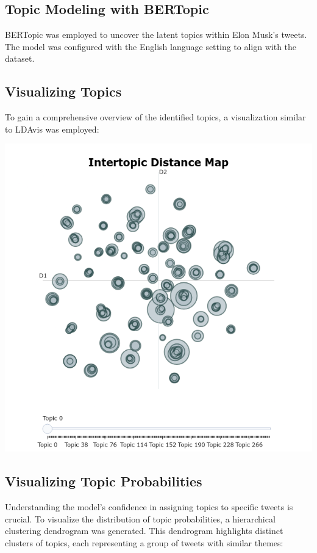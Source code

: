 \documentclass[12pt]{article}
\begin{document}
\subsection{Topic Modeling with BERTopic}
BERTopic was employed to uncover the latent topics within Elon Musk's tweets. The model was configured with the English language setting to align with the dataset.

\subsection{Visualizing Topics}
To gain a comprehensive overview of the identified topics, a visualization similar to LDAvis was employed: \\

\begin{minipage}{0.48\textwidth}
    \centering
    \includegraphics[width=\linewidth]{lda.png}
        \label{fig:lda}
    \end{minipage}\hfill
    \newpage
\subsection{Visualizing Topic Probabilities}
Understanding the model's confidence in assigning topics to specific tweets is crucial. To visualize the distribution of topic probabilities, a hierarchical clustering dendrogram was generated. This dendrogram highlights distinct clusters of topics, each representing a group of tweets with similar themes:
\end{document}
